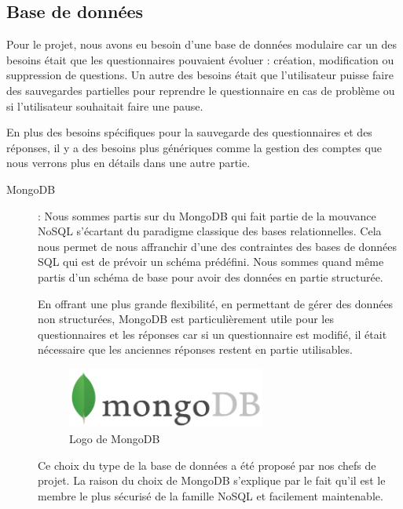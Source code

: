 \subsection{Base de données}

Pour le projet, nous avons eu besoin d'une base de données modulaire car un des besoins était que les questionnaires pouvaient évoluer : création, modification ou suppression de questions. Un autre des besoins était que l'utilisateur puisse faire des sauvegardes partielles pour reprendre le questionnaire en cas de problème ou si l'utilisateur souhaitait faire une pause. 

En plus des besoins spécifiques pour la sauvegarde des questionnaires et des réponses, il y a des besoins plus génériques comme la gestion des comptes que nous verrons plus en détails dans une autre partie.

\begin{description}

\item[MongoDB] : 
Nous sommes partis sur du MongoDB qui fait partie de la mouvance NoSQL s'écartant du paradigme classique des bases relationnelles. Cela nous permet de nous affranchir d'une des contraintes des bases de données SQL qui est de prévoir un schéma prédéfini. Nous sommes quand même partis d'un schéma de base pour avoir des données en partie structurée.

En offrant une plus grande flexibilité, en permettant de gérer des données non structurées, MongoDB est particulièrement utile pour les questionnaires et les réponses car si un questionnaire est modifié, il était nécessaire que les anciennes réponses restent en partie utilisables.

\begin{figure}[H]
    \begin{center}
    \includegraphics[height=2.0cm]{img/mongodb}
    \end{center}
    \caption{Logo de MongoDB}
\end{figure}

Ce choix du type de la base de données a été proposé par nos chefs de projet. La raison du choix de MongoDB s'explique par le fait qu'il est le membre le plus sécurisé de la famille NoSQL et facilement maintenable.   

\end{description}

